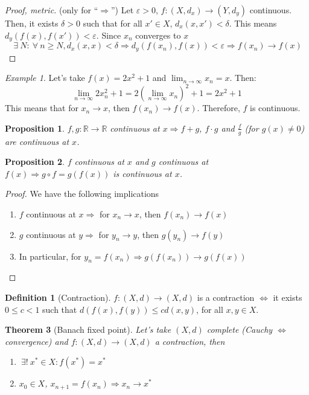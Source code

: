 \documentclass{article}
\newcommand{\DS}{\displaystyle}
\newcommand{\Ar}{\Rightarrow}
\newenvironment{enumarabic}{\begin{enumerate}[label=(\arabic*)]}{\end{enumerate}}
\newenvironment{enumrom}{\begin{enumerate}[label=(\roman*)]}{\end{enumerate}}
\newcommand{\fr}[2]{\frac{#1}{#2}}
\newcommand{\f}[3]{#1 : #2 \rightarrow #3}
\newcommand{\fOnR}[1]{#1 : \mathbb{R} \rightarrow \mathbb{R}}
\newcommand{\limn}{\lim_{n \to \infty}}
\theoremstyle{definition}
\newtheorem{definition}{Definition}[section]
\theoremstyle{definition}
\theoremstyle{plain}
\newtheorem{theorem}{Theorem}[section]
\theoremstyle{plain}
\theoremstyle{plain}
\theoremstyle{plain}
\newtheorem{proposition}[theorem]{Proposition}
\theoremstyle{definition}
\theoremstyle{remark}
\theoremstyle{remark}
\theoremstyle{remark}
\newtheorem{examplet}{Example}[theorem]
\theoremstyle{remark}
\newcommand{\ForAll}{\ \forall \ }
\newcommand{\Exists}{\ \exists \ }
\newcommand{\ExistsI}{\ \exists! \ }
\newcommand{\E}{\varepsilon}
\begin{document}
\begin{proof}[Proof, metric]
  (only for ``$\Ar$'') Let $\E > 0$, $\f{f}{(X,d_x)}{(Y,d_y)}$ continuous. Then, it exists $\delta > 0$ such that for all $x' \in X$, $d_x(x,x') < \delta$. This means $d_y(f(x),f(x')) < \E$. Since $x_n$ converges to $x$
  \[
    \Exists N : \ForAll n \geq N, d_x(x,x) < \delta \Ar d_y(f(x_n),f(x))
    < \E \Ar f(x_n) \to f(x)
  \]
\end{proof}

\begin{examplet}
  Let's take $f(x) = 2x^2 + 1$ and $\DS \limn x_n = x$. Then:
  \[
    \limn 2x_n^2 + 1 = 2 \left(\limn x_n\right)^2 + 1 = 2x^2 + 1
  \]
  This means that for $x_n \to x$, then $f(x_n) \to f(x)$. Therefore, $f$ is continuous.
\end{examplet}


\begin{proposition}
  $\fOnR{f,g}$ continuous at $x \Ar f+g$, $f \cdot g$ and $\fr{f}{g}$ (for $g(x) \neq 0$) are continuous at $x$.
\end{proposition}


\begin{proposition}
  $f$ continuous at $x$ and $g$ continuous at $f(x) \Ar g \circ f = g(f(x))$ is continuous at $x$.
\end{proposition}

\begin{proof} We have the following implications
  \begin{enumarabic}
    \item $f$ continuous at $x \Ar$ for $x_n \to x$, then $f(x_n) \to f(x)$
    \item $g$ continuous at $y \Ar$ for $y_n \to y$, then $g(y_n) \to f(y)$
    \item In particular, for $y_n = f(x_n) \Ar g(f(x_n)) \to g(f(x))$
  \end{enumarabic}
\end{proof}


\begin{definition}[Contraction]
  $\f{f}{(X,d)}{(X,d)}$ is a contraction $\iff$ it exists $0 \leq c < 1$ such that $d(f(x),f(y)) \leq cd(x,y)$, for all $x,y \in X$.
\end{definition}


\begin{theorem}[Banach fixed point]
  Let's take $(X,d)$ complete (Cauchy $\iff$ convergence) and $\f{f}{(X,d)}{(X,d)}$ a contraction, then
  \begin{enumrom}
    \item $\ExistsI x^* \in X : f(x^*) = x^*$
    \item $x_0 \in X$, $x_{n+1} = f(x_n) \Ar x_n \to x^*$
  \end{enumrom}
\end{theorem}
\end{document}

